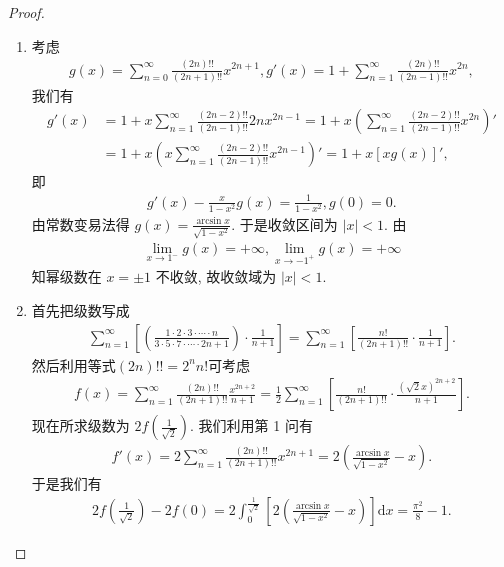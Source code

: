 \documentclass[../../main.tex]{subfiles}%
\begin{document}
\begin{proof}
\begin{enumerate}
\item 考虑
\begin{align*}
g(x) = \sum_{n=0}^{\infty} \frac{(2n)!!}{(2n + 1)!!} x^{2n + 1}, g'(x) = 1 + \sum_{n=1}^{\infty} \frac{(2n)!!}{(2n - 1)!!} x^{2n},
\end{align*}
我们有
\begin{align*}
g'(x) &= 1 + x \sum_{n=1}^{\infty} \frac{(2n - 2)!!}{(2n - 1)!!} 2n x^{2n - 1} = 1 + x \left( \sum_{n=1}^{\infty} \frac{(2n - 2)!!}{(2n - 1)!!} x^{2n} \right)' \\
&= 1 + x \left( x \sum_{n=1}^{\infty} \frac{(2n - 2)!!}{(2n - 1)!!} x^{2n - 1} \right)' = 1 + x [x g(x)]',
\end{align*}
即
\begin{align*}
g'(x) - \frac{x}{1 - x^2} g(x) = \frac{1}{1 - x^2}, g(0) = 0.
\end{align*}
由常数变易法得 $g(x) = \frac{\arcsin x}{\sqrt{1 - x^2}}$. 于是收敛区间为 $|x| < 1$. 由
\begin{align*}
\lim_{x \to 1^-} g(x) = +\infty, \lim_{x \to -1^+} g(x) = +\infty
\end{align*}
知幂级数在 $x = \pm 1$ 不收敛, 故收敛域为 $|x| < 1$.
\item 首先把级数写成
\begin{align*}
\sum_{n=1}^{\infty} \left[ \left( \frac{1 \cdot 2 \cdot 3 \cdot \cdots \cdot n}{3 \cdot 5 \cdot 7 \cdot \cdots \cdot 2n + 1} \right) \cdot \frac{1}{n + 1} \right] = \sum_{n=1}^{\infty} \left[ \frac{n!}{(2n + 1)!!} \cdot \frac{1}{n + 1} \right].
\end{align*}
然后利用等式$(2n)!!=2^nn!$可考虑
\begin{align*}
f(x) = \sum_{n=1}^{\infty} \frac{(2n)!!}{(2n + 1)!!} \frac{x^{2n + 2}}{n + 1} = \frac{1}{2} \sum_{n=1}^{\infty} \left[ \frac{n!}{(2n + 1)!!} \cdot \frac{(\sqrt{2}x)^{2n + 2}}{n + 1} \right].
\end{align*}
现在所求级数为 $2f\left( \frac{1}{\sqrt{2}} \right)$.
我们利用第 1 问有
\begin{align*}
f'(x) = 2 \sum_{n=1}^{\infty} \frac{(2n)!!}{(2n + 1)!!} x^{2n + 1} = 2 \left( \frac{\arcsin x}{\sqrt{1 - x^2}} - x \right).
\end{align*}
于是我们有
\begin{align*}
2f\left( \frac{1}{\sqrt{2}} \right) - 2f(0) = 2 \int_0^{\frac{1}{\sqrt{2}}} \left[ 2 \left( \frac{\arcsin x}{\sqrt{1 - x^2}} - x \right) \right] \mathrm{d}x = \frac{\pi^2}{8} - 1.
\end{align*}
\end{enumerate}

\end{proof}
\end{document}
